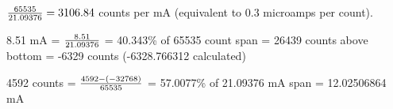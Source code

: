 





\vskip 10pt









\vskip 10pt


\vskip 10pt

${65535 \over 21.09376}= 3106.84$ counts per mA (equivalent to 0.3 microamps per count).

\vskip 10pt

8.51 mA = ${8.51 \over 21.09376}$ = 40.343\% of 65535 count span = 26439 counts above bottom = -6329 counts (-6328.766312 calculated)

\vskip 10pt

4592 counts = ${4592 - (-32768) \over 65535}$ = 57.0077\% of 21.09376 mA span = 12.02506864 mA



